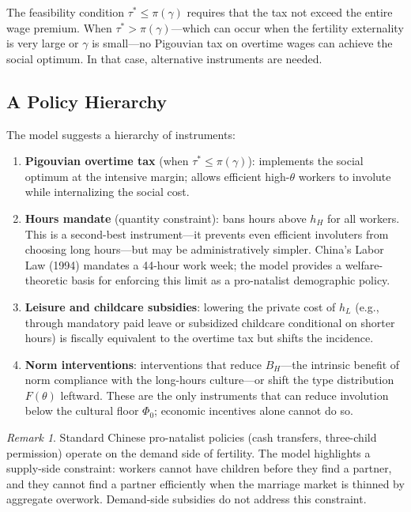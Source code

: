 \documentclass[12pt]{article}
\theoremstyle{plain}
\theoremstyle{definition}
\theoremstyle{remark}
\newtheorem{remark}{Remark}
\newcommand{\hH}{h_{H}}
\newcommand{\hL}{h_{L}}
\begin{document}
The feasibility condition $\tau^{*} \leq \pi(\gamma)$ requires that the tax not
exceed the entire wage premium.  When $\tau^{*} > \pi(\gamma)$---which can occur when
the fertility externality is very large or $\gamma$ is small---no Pigouvian tax on
overtime wages can achieve the social optimum.  In that case, alternative instruments
are needed.

\subsection{A Policy Hierarchy}

The model suggests a hierarchy of instruments:

\begin{enumerate}
  \item \textbf{Pigouvian overtime tax} (when $\tau^{*} \leq \pi(\gamma)$): implements
    the social optimum at the intensive margin; allows efficient high-$\theta$ workers
    to involute while internalizing the social cost.

  \item \textbf{Hours mandate} (quantity constraint): bans hours above $\hH$ for all
    workers.  This is a second-best instrument---it prevents even efficient involuters
    from choosing long hours---but may be administratively simpler.  China's Labor Law
    (1994) mandates a 44-hour work week; the model provides a welfare-theoretic basis
    for enforcing this limit as a pro-natalist demographic policy.

  \item \textbf{Leisure and childcare subsidies}: lowering the private cost of $\hL$
    (e.g., through mandatory paid leave or subsidized childcare conditional on shorter
    hours) is fiscally equivalent to the overtime tax but shifts the incidence.

  \item \textbf{Norm interventions}: interventions that reduce $B_{H}$---the intrinsic
    benefit of norm compliance with the long-hours culture---or shift the type
    distribution $F(\theta)$ leftward.  These are the only instruments that can reduce
    involution below the cultural floor $\Phi_{0}$; economic incentives alone cannot
    do so.
\end{enumerate}

\begin{remark}
Standard Chinese pro-natalist policies (cash transfers, three-child permission) operate
on the demand side of fertility.  The model highlights a supply-side constraint:
workers cannot have children before they find a partner, and they cannot find a partner
efficiently when the marriage market is thinned by aggregate overwork.  Demand-side
subsidies do not address this constraint.
\end{remark}
\end{document}
